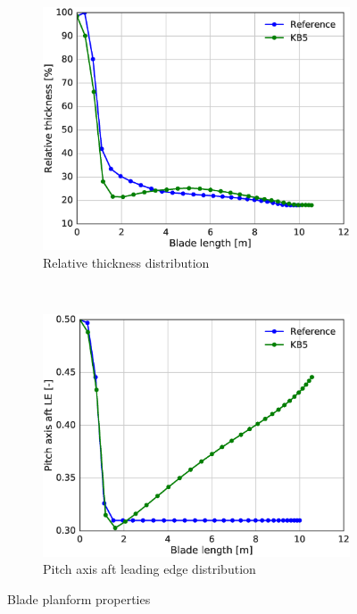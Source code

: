 \begin{figure}[tph]
\begin{subfigure}{0.50\textwidth}
\includegraphics[width=\linewidth]{figures/KB6_final/KB5_rthick.eps}
\caption{Relative thickness distribution}
\label{subfig:KB5_rthick}
\end{subfigure}
 ~
\begin{subfigure}{0.50\textwidth}
\includegraphics[width=\linewidth]{figures/KB6_final/KB5_ple.eps}
\caption{Pitch axis aft leading edge distribution}
\label{subfig:KB5_ple}
\end{subfigure}

\caption{Blade planform properties}
\label{fig:KB5_blade_geom}
\end{figure}

